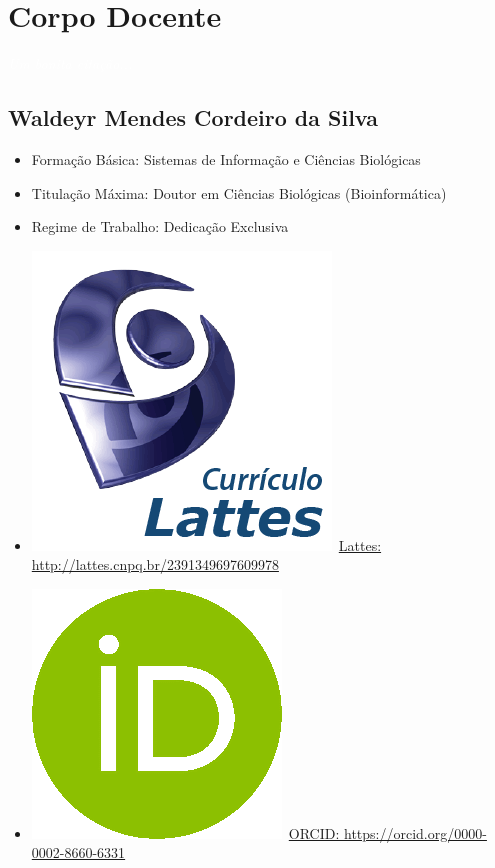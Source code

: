\documentclass[11pt,fleqn]{book} %
\begin{document}
\chapter{Corpo Docente}\label{docentes}
\vspace{6em}
\begin{flushright}
	\textit{\textcolor{white}{Um bonita citação...}}
\end{flushright}
\vspace{12em}

\section{Waldeyr Mendes Cordeiro da Silva}\label{WaldeyrMendes}
\begin{itemize}
	\item Formação Básica: Sistemas de Informação e Ciências Biológicas 
	\item Titulação Máxima: Doutor em Ciências Biológicas (Bioinformática)
	\item Regime de Trabalho: Dedicação Exclusiva
	\item \includegraphics[scale=.03]{Pictures/lattes}~\href{http://lattes.cnpq.br/2391349697609978}{Lattes: http://lattes.cnpq.br/2391349697609978}
	\item \includegraphics[scale=.15]{Pictures/orcid}~\href{https://orcid.org/0000-0002-8660-6331}{ORCID: https://orcid.org/0000-0002-8660-6331}
\end{itemize}
\end{document}
